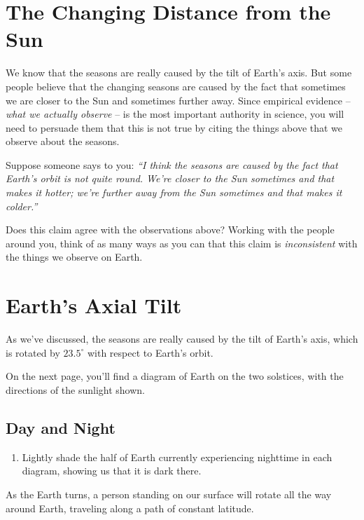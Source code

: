 \documentclass[12pt]{article}
\begin{document}
\section{The Changing Distance from the Sun}

We know that the seasons are really caused by the tilt of Earth's axis. But some people believe that the changing seasons are caused by the fact that sometimes we are closer to the Sun and sometimes further away. Since empirical evidence -- {\it what we actually observe} -- is the most important authority in science, you will need to persuade them that this is not true by citing the things above that we observe about the seasons.

Suppose someone says to you: {\it ``I think the seasons are caused by the fact that Earth's orbit is not quite round. We're closer to the Sun sometimes and that makes it hotter; we're further away from the Sun sometimes and that makes it colder.''}

Does this claim agree with the observations above? Working with the people around you, think of as many ways as you can that this claim is {\it inconsistent} with the things we observe on Earth.

\vspace{3in}

\section{Earth's Axial Tilt}

As we've discussed, the seasons are really caused by the tilt of Earth's axis, which is rotated by $23.5^\circ$ with respect to Earth's orbit.

On the next page, you'll find a diagram of Earth on the two solstices, with the directions of the sunlight shown. 

\subsection{Day and Night}

\begin{enumerate}
	\item {Lightly shade the half of Earth currently experiencing nighttime in each diagram, showing us that it is dark there.}
\end{enumerate}	

As the Earth turns, a person standing on our surface will rotate all the way around Earth, traveling along a path of constant latitude. 
\end{document}
